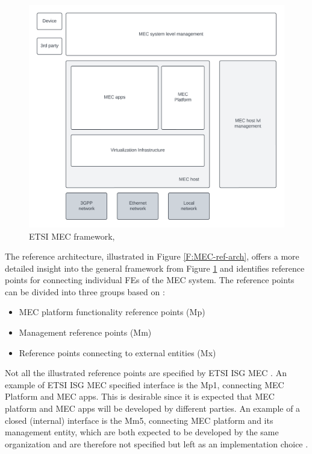 \documentclass[12pt,a4paper,twoside]{report}
\begin{document}
\begin{figure}[ht]
	\centering
	\includegraphics[width=\textwidth]{./images/MEC-framework.png}
	\caption{ETSI MEC framework, \cite{ETSI:GS:MEC003}}
	\label{F:MEC-fw}
\end{figure}

The reference architecture, illustrated in Figure \ref{F:MEC-ref-arch}, offers a more detailed insight into the general framework from Figure \ref{F:MEC-fw} and identifies reference points for connecting individual FEs of the MEC system. The reference points can be divided into three groups based on \cite{ETSI:GS:MEC003}: 
\begin{itemize}
	\item MEC platform functionality reference points (Mp) 
	\item Management reference points (Mm)
	\item Reference points connecting to external entities (Mx)
\end{itemize}
Not all the illustrated reference points are specified by ETSI ISG MEC \cite{ETSI:GS:MEC003}. An example of ETSI ISG MEC specified interface is the Mp1, connecting MEC Platform and MEC apps. This is desirable since it is expected that MEC platform and MEC apps will be developed by different parties. An example of a closed (internal) interface is the Mm5, connecting MEC platform and its management entity, which are both expected to be developed by the same organization and are therefore not specified but left as an implementation choice \cite{ETSI:GS:MEC003,sabella-mec-sw-dev}. 
\end{document}
